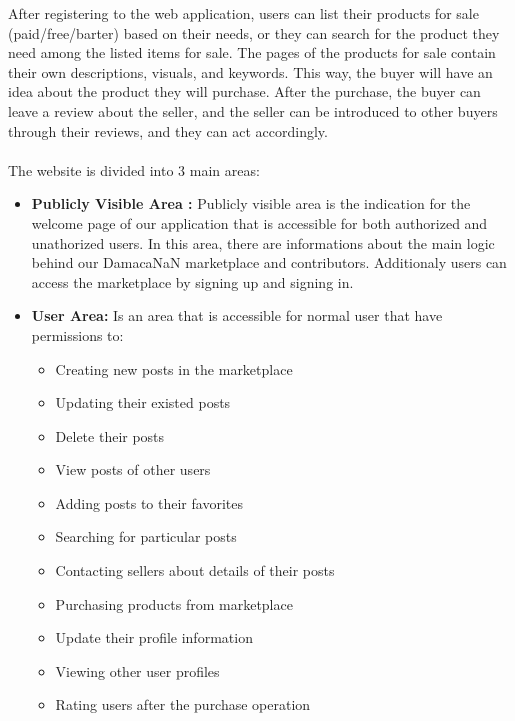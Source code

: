 After registering to the web application, users can list their products for sale (paid/free/barter) based on their needs, or they can search for the product they need among the listed items for sale. The pages of the products for sale contain their own descriptions, visuals, and keywords. This way, the buyer will have an idea about the product they will purchase. After the purchase, the buyer can leave a review about the seller, and the seller can be introduced to other buyers through their reviews, and they can act accordingly.
\\
\\
The website is divided into 3 main areas:
    \begin{itemize}
        \item \textbf{Publicly Visible Area : }Publicly visible area is the indication for the welcome page of our application that is accessible for both authorized and unathorized users. In this area, there are informations about the main logic behind our DamacaNaN marketplace and contributors. Additionaly users can access the marketplace by signing up and signing in.
        \item \textbf{User Area: }Is an area that is accessible for normal user that have permissions to:
        \begin{itemize}
            \item Creating new posts in the marketplace
            \item Updating their existed posts
            \item Delete their posts
            \item View posts of other users
            \item Adding posts to their favorites
            \item Searching for particular posts
            \item Contacting sellers about details of their posts
            \item Purchasing products from marketplace
            \item Update their profile information
            \item Viewing other user profiles
            \item Rating users after the purchase operation
            

\end{itemize}
\end{itemize}
